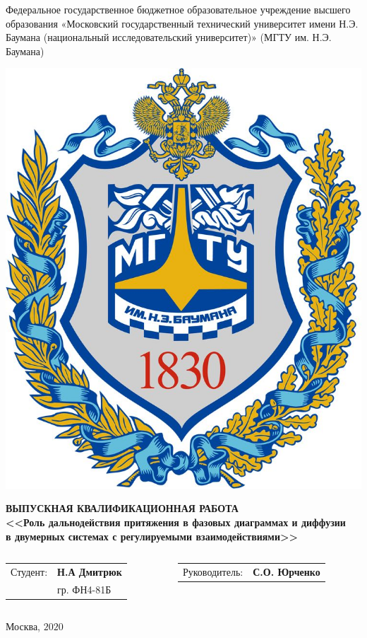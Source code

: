 \documentclass[pdf,hyperref={unicode}]{beamer}
\begin{document}

\begin{frame}
	\begin{center}\tiny
		Федеральное государственное бюджетное образовательное учреждение высшего образования «Московский государственный технический университет имени Н.Э. Баумана (национальный исследовательский университет)» (МГТУ им. Н.Э. Баумана)\\
    \end{center}

	\begin{center}
		\includegraphics[width=0.15\linewidth]{emb}
	\end{center}

	\begin{center}
\tiny \textbf{ВЫПУСКНАЯ КВАЛИФИКАЦИОННАЯ РАБОТА}\\
\tiny \textbf{<<Роль дальнодействия притяжения в фазовых диаграммах и диффузии\\ в двумерных системах с регулируемыми взаимодействиями>>}
\end{center}

	\vspace{0.5cm}
	
	\begin{columns}[T,onlytextwidth]
                \begin{column}{0.50\textwidth}
                        \begin{tabular}{ll}
        \tiny Студент:  & \tiny \textbf{Н.А Дмитрюк}    \\
                   & \tiny гр. ФН4-81Б \\

    \end{tabular}
                \end{column}
                \begin{column}{0.50\textwidth}
                        \begin{tabular}{ll}
        \tiny Руководитель:  & \tiny \textbf{С.О. Юрченко}
                            
    \end{tabular}
                \end{column}
        \end{columns}
        
    
\vfill
\begin{center}
\tiny Москва, $2020$
\end{center}
\end{frame}
\end{document}

